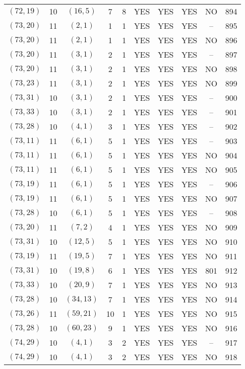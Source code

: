 \begin{longtable}{|c|c|c|c|c|c|c|c|c|c|}
$(72, 19)$ & 10 & $(16, 5)$ & 7 & 8 & YES & YES & YES & NO & 894\\
$(73, 20)$ & 11 & $(2, 1)$ & 1 & 1 & YES & YES & YES & -- & 895\\
$(73, 20)$ & 11 & $(2, 1)$ & 1 & 1 & YES & YES & YES & NO & 896\\
$(73, 20)$ & 11 & $(3, 1)$ & 2 & 1 & YES & YES & YES & -- & 897\\
$(73, 20)$ & 11 & $(3, 1)$ & 2 & 1 & YES & YES & YES & NO & 898\\
$(73, 23)$ & 11 & $(3, 1)$ & 2 & 1 & YES & YES & YES & NO & 899\\
$(73, 31)$ & 10 & $(3, 1)$ & 2 & 1 & YES & YES & YES & -- & 900\\
$(73, 33)$ & 10 & $(3, 1)$ & 2 & 1 & YES & YES & YES & -- & 901\\
$(73, 28)$ & 10 & $(4, 1)$ & 3 & 1 & YES & YES & YES & -- & 902\\
$(73, 11)$ & 11 & $(6, 1)$ & 5 & 1 & YES & YES & YES & -- & 903\\
$(73, 11)$ & 11 & $(6, 1)$ & 5 & 1 & YES & YES & YES & NO & 904\\
$(73, 11)$ & 11 & $(6, 1)$ & 5 & 1 & YES & YES & YES & NO & 905\\
$(73, 19)$ & 11 & $(6, 1)$ & 5 & 1 & YES & YES & YES & -- & 906\\
$(73, 19)$ & 11 & $(6, 1)$ & 5 & 1 & YES & YES & YES & NO & 907\\
$(73, 28)$ & 10 & $(6, 1)$ & 5 & 1 & YES & YES & YES & -- & 908\\
$(73, 20)$ & 11 & $(7, 2)$ & 4 & 1 & YES & YES & YES & NO & 909\\
$(73, 31)$ & 10 & $(12, 5)$ & 5 & 1 & YES & YES & YES & NO & 910\\
$(73, 19)$ & 11 & $(19, 5)$ & 7 & 1 & YES & YES & YES & NO & 911\\
$(73, 31)$ & 10 & $(19, 8)$ & 6 & 1 & YES & YES & YES & 801 & 912\\
$(73, 33)$ & 10 & $(20, 9)$ & 7 & 1 & YES & YES & YES & NO & 913\\
$(73, 28)$ & 10 & $(34, 13)$ & 7 & 1 & YES & YES & YES & NO & 914\\
$(73, 26)$ & 11 & $(59, 21)$ & 10 & 1 & YES & YES & YES & NO & 915\\
$(73, 28)$ & 10 & $(60, 23)$ & 9 & 1 & YES & YES & YES & NO & 916\\
$(74, 29)$ & 10 & $(4, 1)$ & 3 & 2 & YES & YES & YES & -- & 917\\
$(74, 29)$ & 10 & $(4, 1)$ & 3 & 2 & YES & YES & YES & NO & 918\\

\end{longtable}
